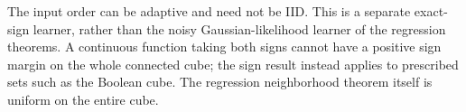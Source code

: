 The input order can be adaptive and need not be IID. This is a separate exact-sign learner, rather than the noisy Gaussian-likelihood learner of the regression theorems. A continuous function taking both signs cannot have a positive sign margin on the whole connected cube; the sign result instead applies to prescribed sets such as the Boolean cube. The regression neighborhood theorem itself is uniform on the entire cube.
